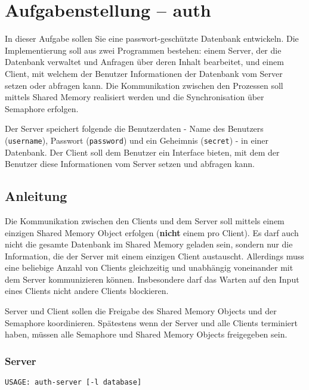 



\section*{Aufgabenstellung -- auth}

In dieser Aufgabe sollen Sie eine passwort-geschützte Datenbank entwickeln. Die
Implementierung soll aus zwei Programmen bestehen: einem Server, der die
Datenbank verwaltet und Anfragen über deren Inhalt bearbeitet, und einem
Client, mit welchem der Benutzer Informationen der Datenbank vom Server setzen
oder abfragen kann. Die Kommunikation zwischen den Prozessen soll mittels
Shared Memory realisiert werden und die Synchronisation über Semaphore
erfolgen.

Der Server speichert folgende die Benutzerdaten - Name des Benutzers
(\texttt{username}), Passwort (\texttt{password}) und ein Geheimnis
(\texttt{secret}) - in einer Datenbank. Der Client soll dem Benutzer ein
Interface bieten, mit dem der Benutzer diese Informationen vom Server setzen
und abfragen kann.

\subsection*{Anleitung}

Die Kommunikation zwischen den Clients und dem Server soll mittels einem
einzigen Shared Memory Object erfolgen (\textbf{nicht} einem pro Client). Es
darf auch nicht die gesamte Datenbank im Shared Memory geladen sein,
sondern nur die Information, die der Server mit einem einzigen Client
austauscht. Allerdings muss eine beliebige Anzahl von Clients gleichzeitig und
unabhängig voneinander mit dem Server kommunizieren können. Insbesondere darf
das Warten auf den Input eines Clients nicht andere Clients blockieren.

Server und Client sollen die Freigabe des Shared Memory Objects und der
Semaphore koordinieren. Spätestens wenn der Server und alle Clients terminiert
haben, müssen alle Semaphore und Shared Memory Objects freigegeben sein.

\subsubsection*{Server}
\begin{verbatim}
USAGE: auth-server [-l database]
\end{verbatim}

